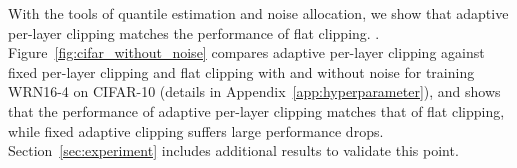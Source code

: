 














    
    











With the tools of quantile estimation and noise allocation, we show that adaptive per-layer clipping matches the performance of flat clipping. . 
Figure~\ref{fig:cifar_without_noise} compares adaptive per-layer clipping against fixed per-layer clipping and flat clipping with and without noise for training WRN16-4 on CIFAR-10 (details in Appendix~\ref{app:hyperparameter}), and
shows that the performance of adaptive per-layer clipping matches that of flat clipping, while fixed adaptive clipping suffers large performance drops.
Section~\ref{sec:experiment} includes additional results to validate this point.



